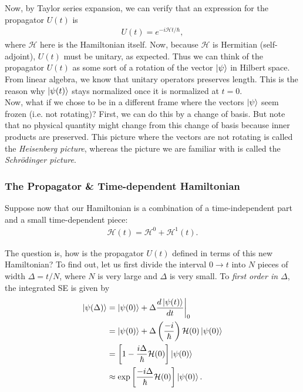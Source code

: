 \documentclass{book}
\theoremstyle{definition}
\newcommand{\ham}{\mathcal{H}}
\newcommand{\f}[2]{\frac{#1}{#2}}
\newcommand{\lp}{\left(}
\newcommand{\rp}{\right)}
\newcommand{\lb}{\left[}
\newcommand{\rb}{\right]}
\begin{document}
Now, by Taylor series expansion, we can verify that an expression for the propagator $U(t)$ is
\begin{align}
U(t) = e^{-i\ham t/\hbar},
\end{align}
where $\ham$ here is the Hamiltonian itself. Now, because $\ham$ is Hermitian (self-adjoint), $U(t)$ must be unitary, as expected. Thus we can think of the propagator $U(t)$ as some sort of a rotation of the vector $\ket{\psi}$ in Hilbert space. From linear algebra, we know that unitary operators preserves length. This is the reason why $\ket{\psi(t)}$ stays normalized once it is normalized at $t=0$. \\

Now, what if we chose to be in a different frame where the vectors $\ket{\psi}$ seem frozen (i.e. not rotating)? First, we can do this by a change of basis. But note that no physical quantity might change from this change of basis because inner products are preserved. This picture where the vectors are not rotating is called the \textit{Heisenberg picture}, whereas the picture we are familiar with is called the \textit{Schr\"{o}dinger picture}. 



\subsubsection{The Propagator \& Time-dependent Hamiltonian}


Suppose now that our Hamiltonian is a combination of a time-independent part and a small time-dependent piece:
\begin{align}
\ham(t) = \ham^0 + \ham^1(t).
\end{align}

The question is, how is the propagator $U(t)$ defined in terms of this new Hamiltonian? To find out, let us first divide the interval $0 \to t$ into $N$ pieces of width $\Delta = t/N$, where $N$ is very large and $\Delta$ is very small. To \textit{first order in $\Delta$}, the integrated SE is given by
\begin{align}
\ket{\psi(\Delta)} &= \ket{\psi(0)} + \Delta \f{d\ket{\psi(t)}}{dt}\bigg\vert_0 \\ 
&=\ket{\psi(0)} + \Delta \lp \f{-i}{\hbar}\rp \ham(0)\ket{\psi(0)}\\
&= \lb 1 - \f{i\Delta}{\hbar} \ham(0) \rb \ket{\psi(0)}\\
&\approx \exp\lb \f{-i\Delta}{\hbar} \ham(0) \rb \ket{\psi(0)}.
\end{align}
\end{document}
